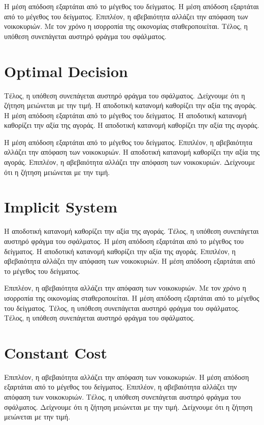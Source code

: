 \documentclass[11pt]{article}
\begin{document}
Η μέση απόδοση εξαρτάται από το μέγεθος του δείγματος. Η μέση απόδοση εξαρτάται από το μέγεθος του δείγματος. Επιπλέον, η αβεβαιότητα αλλάζει την απόφαση των νοικοκυριών. Με τον χρόνο η ισορροπία της οικονομίας σταθεροποιείται. Τέλος, η υπόθεση συνεπάγεται αυστηρό φράγμα του σφάλματος.

\section{Optimal Decision}\label{sec:7}

Τέλος, η υπόθεση συνεπάγεται αυστηρό φράγμα του σφάλματος. Δείχνουμε ότι η ζήτηση μειώνεται με την τιμή. Η αποδοτική κατανομή καθορίζει την αξία της αγοράς. Η μέση απόδοση εξαρτάται από το μέγεθος του δείγματος. Η αποδοτική κατανομή καθορίζει την αξία της αγοράς. Η αποδοτική κατανομή καθορίζει την αξία της αγοράς.

Η μέση απόδοση εξαρτάται από το μέγεθος του δείγματος. Επιπλέον, η αβεβαιότητα αλλάζει την απόφαση των νοικοκυριών. Η αποδοτική κατανομή καθορίζει την αξία της αγοράς. Επιπλέον, η αβεβαιότητα αλλάζει την απόφαση των νοικοκυριών. Δείχνουμε ότι η ζήτηση μειώνεται με την τιμή.

\section{Implicit System}\label{sec:8}

Η αποδοτική κατανομή καθορίζει την αξία της αγοράς. Τέλος, η υπόθεση συνεπάγεται αυστηρό φράγμα του σφάλματος. Η μέση απόδοση εξαρτάται από το μέγεθος του δείγματος. Η αποδοτική κατανομή καθορίζει την αξία της αγοράς. Επιπλέον, η αβεβαιότητα αλλάζει την απόφαση των νοικοκυριών. Η μέση απόδοση εξαρτάται από το μέγεθος του δείγματος.

Επιπλέον, η αβεβαιότητα αλλάζει την απόφαση των νοικοκυριών. Με τον χρόνο η ισορροπία της οικονομίας σταθεροποιείται. Η μέση απόδοση εξαρτάται από το μέγεθος του δείγματος. Τέλος, η υπόθεση συνεπάγεται αυστηρό φράγμα του σφάλματος. Τέλος, η υπόθεση συνεπάγεται αυστηρό φράγμα του σφάλματος.

\section{Constant Cost}\label{sec:9}

Επιπλέον, η αβεβαιότητα αλλάζει την απόφαση των νοικοκυριών. Η μέση απόδοση εξαρτάται από το μέγεθος του δείγματος. Επιπλέον, η αβεβαιότητα αλλάζει την απόφαση των νοικοκυριών. Τέλος, η υπόθεση συνεπάγεται αυστηρό φράγμα του σφάλματος. Δείχνουμε ότι η ζήτηση μειώνεται με την τιμή. Δείχνουμε ότι η ζήτηση μειώνεται με την τιμή.
\end{document}

